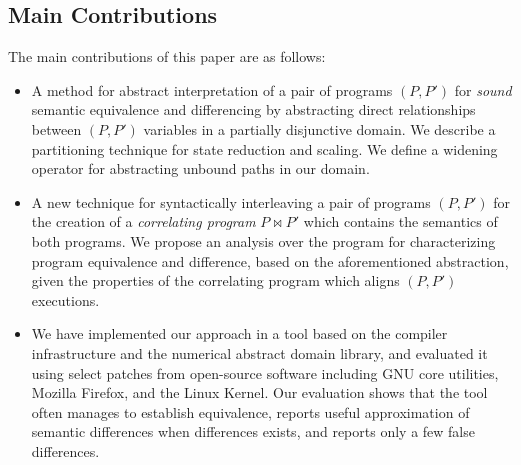 \subsection{Main Contributions}
The main contributions of this paper are as follows:
\begin{itemize}
\item A method for abstract interpretation of a pair of programs $(P,P')$ for \emph{sound} semantic equivalence and differencing by abstracting direct relationships between $(P,P')$ variables in a partially disjunctive domain. We describe a partitioning technique for state reduction and scaling. We define a widening operator for abstracting unbound paths in our domain.
\item A new technique for syntactically interleaving a pair of programs $(P,P')$ for the creation of a \emph{correlating program} $P \bowtie P'$ which contains the semantics of both programs. We propose an analysis over the program for characterizing program equivalence and difference, based on the aforementioned abstraction, given the properties of the correlating program which aligns $(P,P')$ executions.
\item We have implemented our approach in a tool based on the  compiler infrastructure and the  numerical abstract
    domain library, and evaluated it using select patches from open-source software including GNU core utilities, Mozilla
    Firefox, and the Linux Kernel. Our evaluation shows that the tool often manages to establish equivalence, reports useful
    approximation of semantic differences when differences exists, and reports only a few false differences.
\end{itemize}


